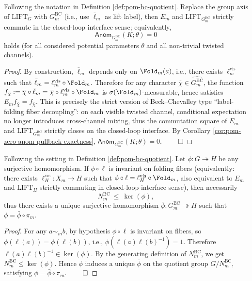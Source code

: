 \begin{proposition}\label{prop:pom-bc-quotient-strictify}
Following the notation in Definition \ref{def:pom-bc-quotient}.
Replace the group axis of \(\mathrm{LIFT}_G\) with \(G^{\mathrm{BC}}_m\) (i.e., use \(\bar\ell_m\) as lift label), then \(E_m\) and \(\mathrm{LIFT}_{G^{\mathrm{BC}}_m}\) strictly commute in the closed-loop interface sense; equivalently,
\[
\mathsf{Anom}_{G^{\mathrm{BC}}_m}(K;\theta)=0
\]
holds (for all considered potential parameters \(\theta\) and all non-trivial twisted channels).
\end{proposition}
\begin{proof}
By construction, \(\bar\ell_m\) depends only on \(\Fold_m(a)\), i.e., there exists \(\ell^{\mathrm{vis}}_m\) such that \(\bar\ell_m=\ell^{\mathrm{vis}}_m\circ \Fold_m\).
Therefore for any character \(\overline\chi\in\widehat{G^{\mathrm{BC}}_m}\), the function
\(
f_{\overline\chi}:=\overline\chi\circ \bar\ell_m
=
\overline\chi\circ \ell^{\mathrm{vis}}_m\circ \Fold_m
\)
is \(\sigma(\Fold_m)\)-measurable, hence satisfies \(E_m f_{\overline\chi}=f_{\overline\chi}\).
This is precisely the strict version of Beck--Chevalley type ``label-folding fiber decoupling'': on each visible twisted channel, conditional expectation no longer introduces cross-channel mixing, thus the commutation square of \(E_m\) and \(\mathrm{LIFT}_{G^{\mathrm{BC}}_m}\) strictly closes on the closed-loop interface.
By Corollary \ref{cor:pom-zero-anom-pullback-exactness}, \(\mathsf{Anom}_{G^{\mathrm{BC}}_m}(K;\theta)=0\). $\qed$
\end{proof}

\begin{proposition}\label{prop:pom-bc-quotient-universal}
Following the setting in Definition \ref{def:pom-bc-quotient}.
Let \(\phi:G\twoheadrightarrow H\) be any surjective homomorphism.
If \(\phi\circ \ell\) is invariant on folding fibers (equivalently: there exists \(\ell_H^{\mathrm{vis}}:X_m\to H\) such that \(\phi\circ\ell=\ell_H^{\mathrm{vis}}\circ\Fold_m\), also equivalent to \(E_m\) and \(\mathrm{LIFT}_H\) strictly commuting in closed-loop interface sense), then necessarily
\[
N^{\mathrm{BC}}_m\ \le\ \ker(\phi),
\]
thus there exists a unique surjective homomorphism \(\bar\phi:G^{\mathrm{BC}}_m\twoheadrightarrow H\) such that \(\phi=\bar\phi\circ \pi_m\).
\end{proposition}
\begin{proof}
For any \(a\sim_m b\), by hypothesis \(\phi\circ\ell\) is invariant on fibers, so \(\phi(\ell(a))=\phi(\ell(b))\), i.e., \(\phi(\ell(a)\ell(b)^{-1})=1\).
Therefore \(\ell(a)\ell(b)^{-1}\in\ker(\phi)\).
By the generating definition of \(N^{\mathrm{BC}}_m\), we get \(N^{\mathrm{BC}}_m\le \ker(\phi)\).
Hence \(\phi\) induces a unique \(\bar\phi\) on the quotient group \(G/N^{\mathrm{BC}}_m\), satisfying \(\phi=\bar\phi\circ\pi_m\). $\qed$
\end{proof}

